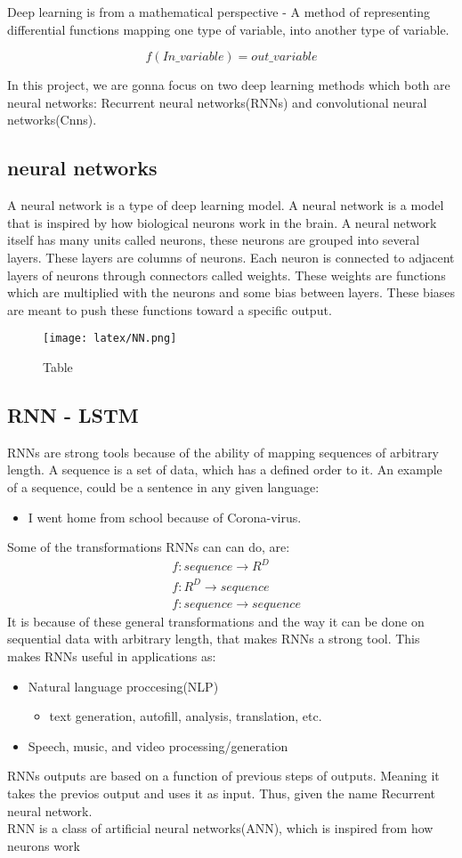 Deep learning is from a mathematical perspective - A method of representing differential functions mapping one type of variable, into another type of variable.

$$
f(In\_variable) = out\_variable
$$

\noindent
In this project, we are gonna focus on two deep learning methods which both are neural networks: Recurrent neural networks(RNNs) and convolutional neural networks(Cnns).

\subsection{neural networks}
A neural network is a type of deep learning model. A neural network is a model that is inspired by how biological neurons work in the brain. A neural network itself has many units called neurons, these neurons are grouped into several layers. These layers are columns of neurons. Each neuron is connected to adjacent layers of neurons through connectors called weights. These weights are functions which are multiplied with the neurons and some bias between layers. These biases are meant to push these functions toward a specific output.

\begin{figure}[!ht]
  \centering
  \texttt{[image: latex/NN.png]}
  \caption{Table}\label{Baseline:before}
\end{figure}

\subsection{RNN - LSTM}
RNNs are strong tools because of the ability of mapping sequences of arbitrary length. A sequence is a set of data, which has a defined order to it. An example of a sequence, could be a sentence in any given language:
\begin{itemize}
    \item I went home from school because of Corona-virus.
\end{itemize}

\noindent
Some of the transformations RNNs can can do, are:
\begin{align*}
	&f:sequence \rightarrow R^D\\
	&f:R^D \rightarrow sequence\\
	&f:sequence \rightarrow sequence
\end{align*}
\noindent
It is because of these general transformations and the way it can be done on sequential data with arbitrary length, that makes RNNs a strong tool. This makes RNNs useful in applications as:
\begin{itemize}
    \item Natural language proccesing(NLP)
    \begin{itemize}
    	\item text generation, autofill, analysis, translation, etc.
    \end{itemize}
    \item Speech, music, and video processing/generation
\end{itemize}

\noindent
RNNs outputs are based on a function of previous steps of outputs. Meaning it takes the previos output and uses it as input. Thus, given the name Recurrent neural network.\\

\noindent
RNN is a class of artificial neural networks(ANN), which is inspired from how neurons work
